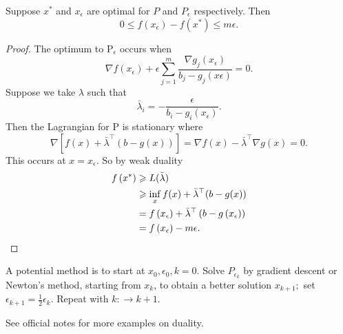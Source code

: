 \begin{theorem}
    Suppose $x^*$ and $x_\epsilon$ are optimal for $P$ and $P_\epsilon$ respectively. Then
    \[
    0 \leq f\left(x_\epsilon\right)-f\left(x^*\right) \leq m \epsilon.
    \]
\end{theorem}
\begin{proof}
    The optimum to $\mathrm{P}_{\epsilon}$ occurs when 
    \[
        \nabla f(x_\epsilon) + \epsilon \sum_{j=1}^{m} \frac{\nabla g_j (x_\epsilon)}{b_j - g_j(x\epsilon)} = 0.
    \]
    Suppose we take $\lambda$ such that
    \[
    \bar{\lambda}_i=-\frac{\epsilon}{b_i-g_i\left(x_\epsilon\right)} .
    \]
    Then the Lagrangian for $\mathrm{P}$ is stationary where
    \[
    \nabla\left[f(x)+\bar{\lambda}^{\top}(b-g(x))\right]=\nabla f(x)-\bar{\lambda}^{\top} \nabla g(x)=0.
    \]
    This occurs at $x=x_\epsilon$. So by weak duality
    \begin{align*}
        f\left(x^*\right) & \geq L(\bar{\lambda}) \\
    & \geq \inf _x f(x)+\bar{\lambda}^{\top}(b-g(x)) \\
    &=f\left(x_\epsilon\right)+\bar{\lambda}^{\top}\left(b-g\left(x_\epsilon\right)\right) \\
    &=f\left(x_\epsilon\right)-m \epsilon.\qedhere
    \end{align*}
\end{proof}

A potential method is to start at $x_0, \epsilon_0, k=0$. Solve $P_{\epsilon_k}$ by gradient descent or Newton's method, starting from $x_k$, to obtain a better solution $x_{k+1} ;$ set $\epsilon_{k+1}=\frac{1}{2} \epsilon_k$. Repeat with $k: \rightarrow k+1$.

See official notes for more examples on duality.